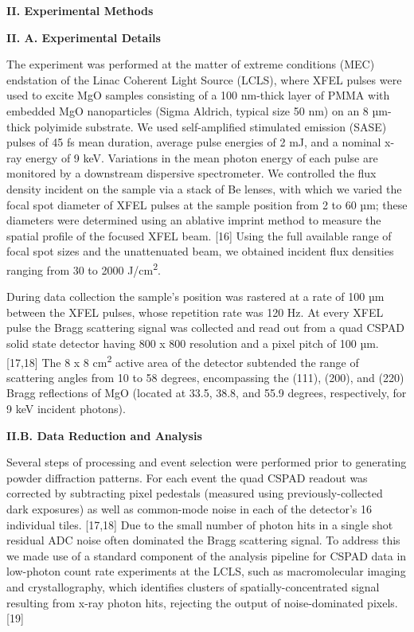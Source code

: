 \textbf{II. Experimental Methods}

\textbf{II. A. Experimental Details}

The experiment was performed at the matter of extreme conditions (MEC)
endstation of the Linac Coherent Light Source (LCLS), where XFEL pulses
were used to excite MgO samples consisting of a 100 nm-thick layer of
PMMA with embedded MgO nanoparticles (Sigma Aldrich, typical size 50 nm)
on an 8 µm-thick polyimide substrate. We used self-amplified stimulated
emission (SASE) pulses of 45 fs mean duration, average pulse energies of
2 mJ, and a nominal x-ray energy of 9 keV. Variations in the mean photon
energy of each pulse are monitored by a downstream dispersive
spectrometer. We controlled the flux density incident on the sample via
a stack of Be lenses, with which we varied the focal spot diameter of
XFEL pulses at the sample position from 2 to 60 µm; these diameters were
determined using an ablative imprint method to measure the spatial
profile of the focused XFEL beam. {[}16{]} Using the full available
range of focal spot sizes and the unattenuated beam, we obtained
incident flux densities ranging from 30 to 2000 J/cm\textsuperscript{2}.

During data collection the sample's position was rastered at a rate of
100 µm between the XFEL pulses, whose repetition rate was 120 Hz. At
every XFEL pulse the Bragg scattering signal was collected and read out
from a quad CSPAD solid state detector having 800 x 800 resolution and a
pixel pitch of 100 µm. {[}17,18{]} The 8 x 8 cm\textsuperscript{2}
active area of the detector subtended the range of scattering angles
from 10 to 58 degrees, encompassing the (111), (200), and (220) Bragg
reflections of MgO (located at 33.5, 38.8, and 55.9 degrees,
respectively, for 9 keV incident photons).

\textbf{II.B. Data Reduction and Analysis}

Several steps of processing and event selection were performed prior to
generating powder diffraction patterns. For each event the quad CSPAD
readout was corrected by subtracting pixel pedestals (measured using
previously-collected dark exposures) as well as common-mode noise in
each of the detector's 16 individual tiles. {[}17,18{]} Due to the small
number of photon hits in a single shot residual ADC noise often
dominated the Bragg scattering signal. To address this we made use of a
standard component of the analysis pipeline for CSPAD data in low-photon
count rate experiments at the LCLS, such as macromolecular imaging and
crystallography, which identifies clusters of spatially-concentrated
signal resulting from x-ray photon hits, rejecting the output of
noise-dominated pixels. {[}19{]}

